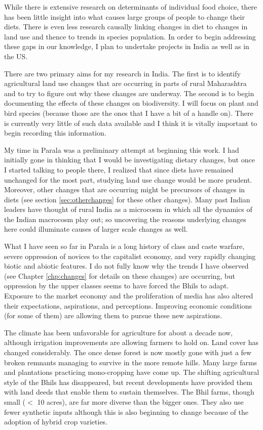 \documentclass[report.tex]{subfiles}
\begin{document}
While there is extensive research on determinants of individual food choice, there has been little insight into what causes large groups of people to change their diets. There is even less research causally linking changes in diet to changes in land use and thence to trends in species population. In order to begin addressing these gaps in our knowledge, I plan to undertake projects in India as well as in the US.

There are two primary aims for my research in India. The first is to identify agricultural land use changes that are occurring in parts of rural Maharashtra and to try to figure out why these changes are underway. The second is to begin documenting the effects of these changes on biodiversity. I will focus on plant and bird species (because those are the ones that I have a bit of a handle on). There is currently very little of such data available and I think it is vitally important to begin recording this information.

My time in Parala was a preliminary attempt at beginning this work. I had initially gone in thinking that I would be investigating dietary changes, but once I started talking to people there, I realized that since diets have remained unchanged for the most part, studying land use change would be more prudent. Moreover, other changes that are occurring might be precursors of changes in diets (see section \ref{sec:otherchanges} for these other changes). Many past Indian leaders have thought of rural India as a microcosm in which all the dynamics of the Indian macrocosm play out; so uncovering the reasons underlying changes here could illuminate causes of larger scale changes as well.

What I have seen so far in Parala is a long history of class and caste warfare, severe oppression of novices to the capitalist economy, and very rapidly changing biotic and abiotic features. I do not fully know why the trends I have observed (see Chapter \ref{chp:changes} for details on these changes) are occurring, but oppression by the upper classes seems to have forced the Bhils to adapt. Exposure to the market economy and the proliferation of media has also altered their expectations, aspirations, and perceptions. Improving economic conditions (for some of them) are allowing them to pursue these new aspirations.

The climate has been unfavorable for agriculture for about a decade now, although irrigation improvements are allowing farmers to hold on. Land cover has changed considerably. The once dense forest is now mostly gone with just a few broken remnants managing to survive in the more remote hills. Many large farms and plantations practicing mono-cropping have come up. The shifting agricultural style of the Bhils has disappeared, but recent developments have provided them with land deeds that enable them to sustain themselves. The Bhil farms, though small ($<$ 10 acres), are far more diverse than the bigger ones. They also use fewer synthetic inputs although this is also beginning to change because of the adoption of hybrid crop varieties.
\end{document}
